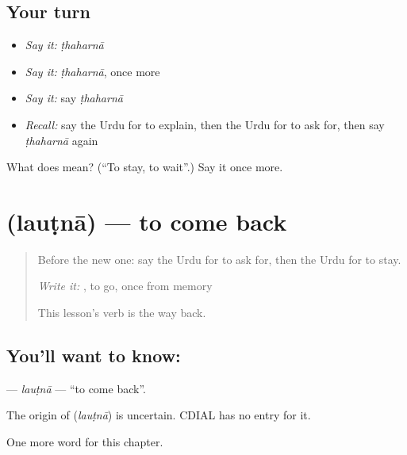 \subsection*{Your turn}
\begin{itemize}
\raggedright
  \item \emph{Say it:} \emph{ṭhaharnā}
  \item \emph{Say it:} \emph{ṭhaharnā}, once more
  \item \emph{Say it:} say \emph{ṭhaharnā}
  \item \emph{Recall:} say the Urdu for to explain, then the Urdu for to ask for, then say \emph{ṭhaharnā} again
\end{itemize}

\begin{tcolorbox}[breakable,colback=teal!4,colframe=teal!35!black,title={Before you move on}]
What does  mean? (\textquotedblleft{}To stay, to wait\textquotedblright{}.) Say it once more.
\end{tcolorbox}
\section[\texorpdfstring{\ur{لوٹنا} (lauṭnā)}{لوٹنا (lauṭnā)}]{ (lauṭnā) — to come back}

\label{lesson:UR-C141-lautna}



\begin{quote}
Before the new one: say the Urdu for to ask for, then the Urdu for to stay.

\emph{Write it:} \textbf{}, to go, once from memory

This lesson's verb is the way back.
\end{quote}

\subsection*{You'll want to know: }
\textbf{} — \emph{lauṭnā} — \textquotedblleft{}to come back\textquotedblright{}.

\begin{cousinweb}
The origin of \textbf{} (\emph{lauṭnā}) is uncertain. CDIAL has no entry for it.
\end{cousinweb}

\begin{grammarlens}[title={What you've built}]
One more word for this chapter.
\end{grammarlens}

